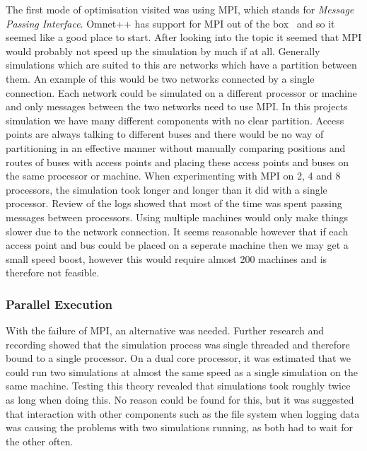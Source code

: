 \documentclass[12pt,a4paper,notitlepage]{article}
\begin{document}
The first mode of optimisation visited was using MPI, which stands for \emph{Message Passing Interface}. Omnet++ has support for MPI out of the box~\cite{omnetmpi} and so it seemed like a good place to start. After looking into the topic it seemed that MPI would probably not speed up the simulation by much if at all. Generally simulations which are suited to this are networks which have a partition between them. An example of this would be two networks connected by a single connection. Each network could be simulated on a different processor or machine and only messages between the two networks need to use MPI. In this projects simulation we have many different components with no clear partition. Access points are always talking to different buses and there would be no way of partitioning in an effective manner without manually comparing positions and routes of buses with access points and placing these access points and buses on the same processor or machine. When experimenting with MPI on 2, 4 and 8 processors, the simulation took longer and longer than it did with a single processor. Review of the logs showed that most of the time was spent passing messages between processors. Using multiple machines would only make things slower due to the network connection. It seems reasonable however that if each access point and bus could be placed on a seperate machine then we may get a small speed boost, however this would require almost 200 machines and is therefore not feasible. 

\subsubsection{Parallel Execution}

With the failure of MPI, an alternative was needed. Further research and recording showed that the simulation process was single threaded and therefore bound to a single processor. On a dual core processor, it was estimated that we could run two simulations at almost the same speed as a single simulation on the same machine. Testing this theory revealed that simulations took roughly twice as long when doing this. No reason could be found for this, but it was suggested that interaction with other components such as the file system when logging data was causing the problems with two simulations running, as both had to wait for the other often. 
\end{document}
